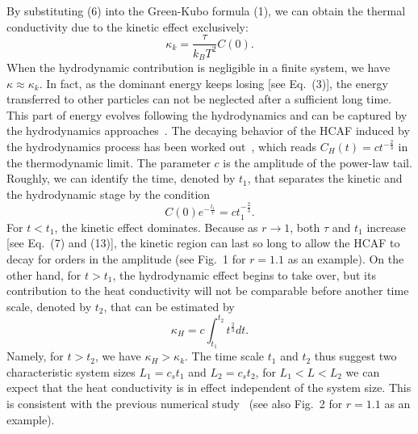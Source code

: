\documentclass[twocolumn,secnumarabic,amssymb, nobibnotes, aps, pre,superscriptaddress]{revtex4}
\begin{document}
By substituting (6) into the Green-Kubo formula (1), we can obtain the thermal conductivity due to the kinetic effect exclusively:
\begin{equation}
\kappa_{k}=\frac{\tau}{k_B T^2}C(0).
\end{equation}
When the hydrodynamic contribution is negligible in a finite system, we have $\kappa\approx \kappa_k$.  In fact, as the dominant energy keeps losing [see Eq.~(3)], the energy transferred to other particles can not be neglected after a sufficient long time. This part of energy evolves following the hydrodynamics and can be captured by the hydrodynamics approaches~\cite{beijeren}. The decaying behavior of the HCAF induced by the hydrodynamics process has been worked out~\cite{spohn,beijeren,spohn2}, which reads $C_H(t)=ct^{-\frac{2}{3}}$ in the thermodynamic limit.  The parameter $c$ is the amplitude of the power-law tail. Roughly, we can identify the time, denoted by $t_1$, that separates the kinetic and the hydrodynamic stage by the condition
\begin{equation}
C(0) e^{-\frac{t_1}{\tau}}=ct_1^{-\frac{2}{3}}.
\end{equation}
For $t<t_1$, the kinetic effect dominates. Because as $r\to 1$, both $\tau$ and $t_1$ increase [see Eq.~(7) and (13)], the kinetic region can last so long to allow the HCAF to decay for orders in the amplitude (see Fig.~1 for $r=1.1$ as an example). On the other hand, for $t>t_1$, the hydrodynamic effect begins to take over, but its contribution to the heat conductivity will not be comparable before another time scale, denoted by $t_2$, that can be estimated by
\begin{equation}
\kappa_H = c\int_{t_1}^{t_2}t^{\frac{2}{3}}dt.
\end{equation}
Namely, for $t>t_2$, we have $\kappa_H>\kappa_k$. The time scale $t_1$ and $t_2$ thus suggest two characteristic system sizes $L_1=c_s t_1$ and $L_2=c_s t_2$, for $L_1<L<L_2$ we can expect that the heat conductivity is in effect independent of the system size. This is consistent with the previous numerical study~\cite{chendiatom2} (see also Fig.~2 for $r=1.1$ as an example).
\end{document}
